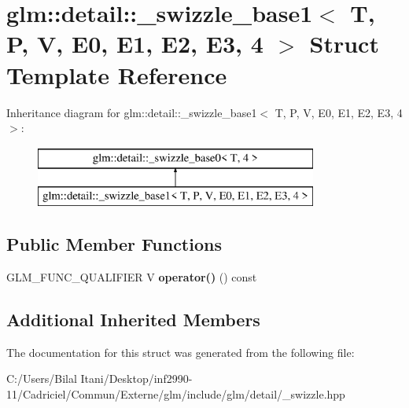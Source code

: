 \hypertarget{structglm_1_1detail_1_1__swizzle__base1_3_01_t_00_01_p_00_01_v_00_01_e0_00_01_e1_00_01_e2_00_01_e3_00_014_01_4}{}\section{glm\+:\+:detail\+:\+:\+\_\+swizzle\+\_\+base1$<$ T, P, V, E0, E1, E2, E3, 4 $>$ Struct Template Reference}
\label{structglm_1_1detail_1_1__swizzle__base1_3_01_t_00_01_p_00_01_v_00_01_e0_00_01_e1_00_01_e2_00_01_e3_00_014_01_4}
Inheritance diagram for glm\+:\+:detail\+:\+:\+\_\+swizzle\+\_\+base1$<$ T, P, V, E0, E1, E2, E3, 4 $>$\+:\begin{figure}[H]
\begin{center}
\leavevmode
\includegraphics[height=2.000000cm]{structglm_1_1detail_1_1__swizzle__base1_3_01_t_00_01_p_00_01_v_00_01_e0_00_01_e1_00_01_e2_00_01_e3_00_014_01_4}
\end{center}
\end{figure}
\subsection*{Public Member Functions}
\begin{DoxyCompactItemize}
\item 
G\+L\+M\+\_\+\+F\+U\+N\+C\+\_\+\+Q\+U\+A\+L\+I\+F\+I\+ER V {\bfseries operator()} () const \hypertarget{structglm_1_1detail_1_1__swizzle__base1_3_01_t_00_01_p_00_01_v_00_01_e0_00_01_e1_00_01_e2_00_01_e3_00_014_01_4_a901f3af50b0eb022c3246b5de5027245}{}\label{structglm_1_1detail_1_1__swizzle__base1_3_01_t_00_01_p_00_01_v_00_01_e0_00_01_e1_00_01_e2_00_01_e3_00_014_01_4_a901f3af50b0eb022c3246b5de5027245}

\end{DoxyCompactItemize}
\subsection*{Additional Inherited Members}


The documentation for this struct was generated from the following file\+:\begin{DoxyCompactItemize}
\item 
C\+:/\+Users/\+Bilal Itani/\+Desktop/inf2990-\/11/\+Cadriciel/\+Commun/\+Externe/glm/include/glm/detail/\+\_\+swizzle.\+hpp\end{DoxyCompactItemize}
